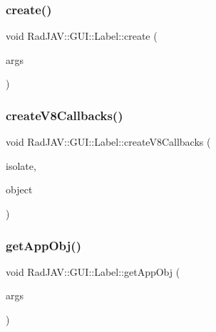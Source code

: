 \subsubsection{\texorpdfstring{create()}{create()}}
{\footnotesize\ttfamily void Rad\+J\+A\+V\+::\+G\+U\+I\+::\+Label\+::create (\begin{DoxyParamCaption}\item[{const v8\+::\+Function\+Callback\+Info$<$ v8\+::\+Value $>$ \&}]{args }\end{DoxyParamCaption})\hspace{0.3cm}{\ttfamily [static]}}

\mbox{\label{class_rad_j_a_v_1_1_g_u_i_1_1_label_ada280a92d3815ba5ce7766f4211956c8}} 
\subsubsection{\texorpdfstring{create\+V8\+Callbacks()}{createV8Callbacks()}}
{\footnotesize\ttfamily void Rad\+J\+A\+V\+::\+G\+U\+I\+::\+Label\+::create\+V8\+Callbacks (\begin{DoxyParamCaption}\item[{v8\+::\+Isolate $\ast$}]{isolate,  }\item[{v8\+::\+Local$<$ v8\+::\+Object $>$}]{object }\end{DoxyParamCaption})\hspace{0.3cm}{\ttfamily [static]}}

\mbox{\label{class_rad_j_a_v_1_1_g_u_i_1_1_label_aded49c5d4574306e1446f7b1bdd53d16}} 
\subsubsection{\texorpdfstring{get\+App\+Obj()}{getAppObj()}}
{\footnotesize\ttfamily void Rad\+J\+A\+V\+::\+G\+U\+I\+::\+Label\+::get\+App\+Obj (\begin{DoxyParamCaption}\item[{const v8\+::\+Function\+Callback\+Info$<$ v8\+::\+Value $>$ \&}]{args }\end{DoxyParamCaption})\hspace{0.3cm}{\ttfamily [static]}}

